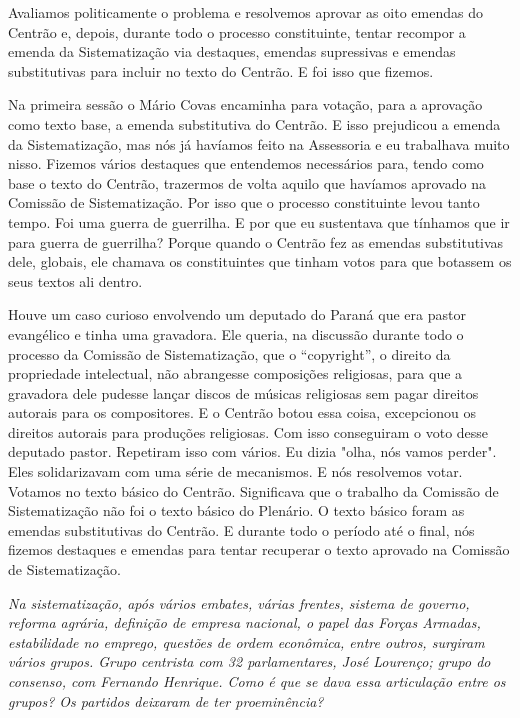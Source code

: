 Avaliamos politicamente o problema e resolvemos aprovar as oito emendas
do Centrão e, depois, durante todo o processo constituinte, tentar
recompor a emenda da Sistematização via destaques, emendas supressivas e
emendas substitutivas para incluir no texto do Centrão. E foi isso que
fizemos.

Na primeira sessão o Mário Covas encaminha para votação, para a
aprovação como texto base, a emenda substitutiva do Centrão. E isso
prejudicou a emenda da Sistematização, mas nós já havíamos feito na
Assessoria e eu trabalhava muito nisso. Fizemos vários destaques que
entendemos necessários para, tendo como base o texto do Centrão,
trazermos de volta aquilo que havíamos aprovado na Comissão de
Sistematização. Por isso que o processo constituinte levou tanto tempo.
Foi uma guerra de guerrilha. E por que eu sustentava que tínhamos que ir
para guerra de guerrilha? Porque quando o Centrão fez as emendas
substitutivas dele, globais, ele chamava os constituintes que tinham
votos para que botassem os seus textos ali dentro.

Houve um caso curioso envolvendo um deputado do Paraná que era pastor
evangélico e tinha uma gravadora. Ele queria, na discussão durante todo
o processo da Comissão de Sistematização, que o ``copyright'', o direito
da propriedade intelectual, não abrangesse composições religiosas, para
que a gravadora dele pudesse lançar discos de músicas religiosas sem
pagar direitos autorais para os compositores. E o Centrão botou essa
coisa, excepcionou os direitos autorais para produções religiosas. Com
isso conseguiram o voto desse deputado pastor. Repetiram isso com
vários. Eu dizia "olha, nós vamos perder". Eles solidarizavam com uma
série de mecanismos. E nós resolvemos votar. Votamos no texto básico do
Centrão. Significava que o trabalho da Comissão de Sistematização não
foi o texto básico do Plenário. O texto básico foram as emendas
substitutivas do Centrão. E durante todo o período até o final, nós
fizemos destaques e emendas para tentar recuperar o texto aprovado na
Comissão de Sistematização.

\medskip

\noindent\emph{Na sistematização, após vários embates, várias frentes, sistema
de governo, reforma agrária, definição de empresa nacional, o papel das
Forças Armadas, estabilidade no emprego, questões de ordem econômica,
entre outros, surgiram vários grupos. Grupo centrista com 32
parlamentares, José Lourenço; grupo do consenso, com Fernando Henrique.
Como é que se dava essa articulação entre os grupos? Os partidos
deixaram de ter proeminência?}

